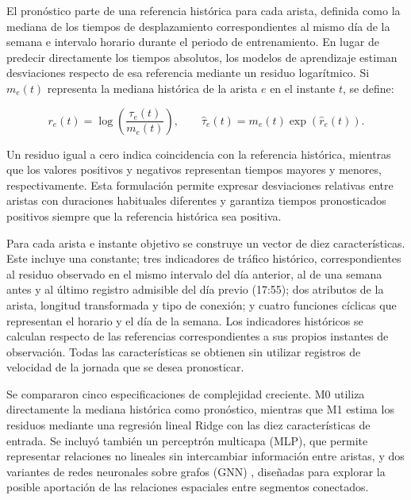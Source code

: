 \documentclass[letterpaper,11pt]{article}
\begin{document}
El pronóstico parte de una referencia histórica para cada arista, definida como la mediana de los tiempos de desplazamiento correspondientes al mismo día de la semana e intervalo horario durante el periodo de entrenamiento. En lugar de predecir directamente los tiempos absolutos, los modelos de aprendizaje estiman desviaciones respecto de esa referencia mediante un residuo logarítmico. Si $m_e(t)$ representa la mediana histórica de la arista $e$ en el instante $t$, se define:

\begin{equation}
r_e(t)=\log\!\left(\frac{\tau_e(t)}{m_e(t)}\right), \qquad
\widehat{\tau}_e(t)=m_e(t)\exp\!\left(\widehat r_e(t)\right).
\label{eq:residuo}
\end{equation}

Un residuo igual a cero indica coincidencia con la referencia histórica, mientras que los valores positivos y negativos representan tiempos mayores y menores, respectivamente. Esta formulación permite expresar desviaciones relativas entre aristas con duraciones habituales diferentes y garantiza tiempos pronosticados positivos siempre que la referencia histórica sea positiva.

Para cada arista e instante objetivo se construye un vector de diez características. Este incluye una constante; tres indicadores de tráfico histórico, correspondientes al residuo observado en el mismo intervalo del día anterior, al de una semana antes y al último registro admisible del día previo (17:55); dos atributos de la arista, longitud transformada y tipo de conexión; y cuatro funciones cíclicas que representan el horario y el día de la semana. Los indicadores históricos se calculan respecto de las referencias correspondientes a sus propios instantes de observación. Todas las características se obtienen sin utilizar registros de velocidad de la jornada que se desea pronosticar.

Se compararon cinco especificaciones de complejidad creciente. M0 utiliza directamente la mediana histórica como pronóstico, mientras que M1 estima los residuos mediante una regresión lineal Ridge con las diez características de entrada. Se incluyó también un perceptrón multicapa (MLP), que permite representar relaciones no lineales sin intercambiar información entre aristas, y dos variantes de redes neuronales sobre grafos (GNN) \parencite{gilmer2017}, diseñadas para explorar la posible aportación de las relaciones espaciales entre segmentos conectados.
\end{document}
